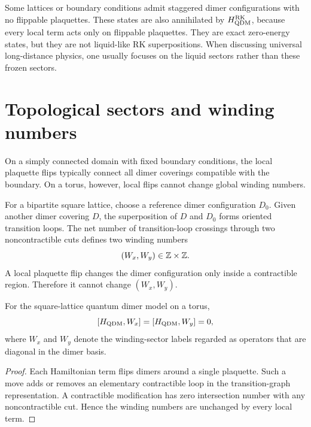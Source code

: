 \begin{remark}
Some lattices or boundary conditions admit staggered dimer configurations with
no flippable plaquettes.  These states are also annihilated by
\(H_{\rm QDM}^{\rm RK}\), because every local term acts only on flippable
plaquettes.  They are exact zero-energy states, but they are not liquid-like RK
superpositions.  When discussing universal long-distance physics, one usually
focuses on the liquid sectors rather than these frozen sectors.
\end{remark}

\section{Topological sectors and winding numbers}
\label{sec:qdm-topological-sectors}

On a simply connected domain with fixed boundary conditions, the local plaquette
flips typically connect all dimer coverings compatible with the boundary.  On a
torus, however, local flips cannot change global winding numbers.

For a bipartite square lattice, choose a reference dimer configuration \(D_0\).
Given another dimer covering \(D\), the superposition of \(D\) and \(D_0\) forms
oriented transition loops.  The net number of transition-loop crossings through
two noncontractible cuts defines two winding numbers
\begin{equation}
\label{eq:qdm-winding-numbers}
    (W_x,W_y)\in\mathbb{Z}\times\mathbb{Z} .
\end{equation}
A local plaquette flip changes the dimer configuration only inside a
contractible region.  Therefore it cannot change \((W_x,W_y)\).

\begin{proposition}
For the square-lattice quantum dimer model on a torus,
\begin{equation}
\label{eq:qdm-winding-conservation}
    [H_{\rm QDM},W_x]=[H_{\rm QDM},W_y]=0,
\end{equation}
where \(W_x\) and \(W_y\) denote the winding-sector labels regarded as operators
that are diagonal in the dimer basis.
\end{proposition}

\begin{proof}
Each Hamiltonian term flips dimers around a single plaquette.  Such a move adds
or removes an elementary contractible loop in the transition-graph
representation.  A contractible modification has zero intersection number with
any noncontractible cut.  Hence the winding numbers are unchanged by every
local term.
\end{proof}

